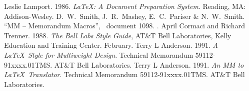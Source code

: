 \begin{thebibliography}{99}

Leslie Lamport.  1986.  {\it \LaTeX : A Document
Preparation System}.  Reading, MA: Addison-Wesley.
D.\ W.\ Smith, J.\ R.\ Mashey, E.\ C.\ Pariser \& N.\
W.\ Smith. ``MM -- Memorandum Macros'', \UNIX\ document 1098.
.
April Cormaci and Richard Trenner.  1988. {\it The Bell
Labs Style Guide}, AT\&T Bell Laboratories, Kelly Education and
Training Center. February.
Terry L Anderson.  1991. {\it A \LaTeX\ Style for Multiweight
Design}.  Technical Memorandum 59112-91xxxx.01TMS. AT\&T Bell Laboratories.
\bibitem{bib:mm2tex}Terry L Anderson.  1991. {\it An MM to \LaTeX\
Translator}. Technical Memorandum 59112-91xxxx.01TMS. AT\&T Bell Laboratories.
\end{thebibliography}
\appendices
